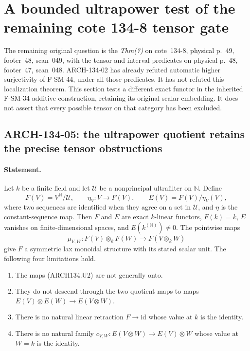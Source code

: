 \section{A bounded ultrapower test of the remaining cote 134-8 tensor gate}
\label{sec:arch134-ultrapower}

The remaining original question is the \emph{Thm(?)} on cote~134-8,
physical p.~49, footer~48, scan~049, with the tensor and interval
predicates on physical p.~48, footer~47, scan~048.  ARCH-134-02 has
already refuted automatic higher surjectivity of F-SM-44, under all
those predicates.  It has not refuted this localization theorem.
This section tests a different exact functor in the inherited
F-SM-34 additive construction, retaining its original scalar
embedding.  It does not assert that every possible tensor on that
category has been excluded.

\subsection{ARCH-134-05: the ultrapower quotient retains the precise tensor obstructions}

\paragraph{Statement.}
Let $k$ be a finite field and let $\mathcal U$ be a nonprincipal
ultrafilter on $\mathbb N$.  Define
\[
 F(V)=V^{\mathbb N}/\mathcal U,\qquad
 \eta_V:V\longrightarrow F(V),\qquad
 E(V)=F(V)/\eta_V(V),
 \tag{ARCH134.U1}
\]
where two sequences are identified when they agree on a set in
$\mathcal U$, and $\eta$ is the constant-sequence map.  Then $F$
and $E$ are exact $k$-linear functors, $F(k)=k$, $E$ vanishes on
finite-dimensional spaces, and $E(k^{(\mathbb N)})\ne0$.
The pointwise maps
\[
 \mu_{V,W}:F(V)\otimes_kF(W)\longrightarrow F(V\otimes_kW)
 \tag{ARCH134.U2}
\]
give $F$ a symmetric lax monoidal structure with its stated scalar
unit.  The following four limitations hold.

\begin{enumerate}
\item The maps (ARCH134.U2) are not generally onto.
\item They do not descend through the two quotient maps to maps
      $E(V)\otimes E(W)\to E(V\otimes W)$.
\item There is no natural linear retraction $F\to\mathrm{id}$
      whose value at $k$ is the identity.
\item There is no natural family
      $c_{V,W}:E(V\otimes W)\to E(V)\otimes W$ whose value at
      $W=k$ is the identity.
\end{enumerate}


